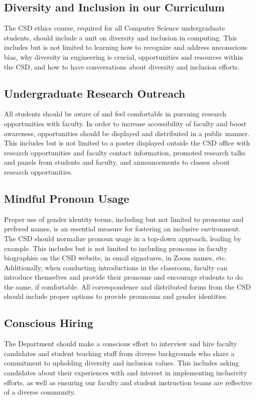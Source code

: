 \documentclass{article}
\begin{document}
\subsection{Diversity and Inclusion in our Curriculum} 
The CSD ethics course, required for all Computer Science undergraduate students, 
should include a unit on diversity and inclusion in computing. 
This includes but is not limited to learning how to recognize and address unconscious bias, why diversity in 
engineering is crucial, opportunities and resources within the CSD, and how to have conversations about diversity 
and inclusion efforts. 

\subsection{Undergraduate Research Outreach} 
All students should be aware of and feel comfortable in pursuing 
research opportunities with faculty. In order to increase accessibility of faculty and boost awareness, 
opportunities should be displayed and distributed in a public manner. This includes but is not limited to a poster 
displayed outside the CSD office with research opportunities and faculty contact information, promoted research 
talks and panels from students and faculty, and announcements to classes about research opportunities.

\subsection{Mindful Pronoun Usage} 
Proper use of gender identity terms, including but not limited to pronouns and prefered names, 
is an essential measure for fostering an inclusive environment. The CSD should normalize pronoun usage in a 
top-down approach, leading by example. This includes but is not limited to including pronouns in faculty biographies 
on the CSD website, in email signatures, in Zoom names, etc. Additionally, when conducting introductions in the 
classroom, faculty can introduce themselves and provide their pronouns and encourage students to do the same, if 
comfortable. All correspondence and distributed forms from the CSD should include proper options to provide prounouns 
and gender identities. 

\subsection{Conscious Hiring} 
The Department should make a conscious effort to interview and hire faculty candidates and 
student teaching staff from diverse backgrounds who share a commitment to upholding diversity and inclusion values. 
This includes asking candidates about their experiences with and interest in implementing inclusivity efforts, as well 
as ensuring our faculty and student instruction teams are reflective of a diverse community. 
\end{document}
